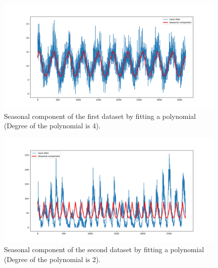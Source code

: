 \begin{figure}[H]
    \centering
    \begin{minipage}[b]{1\textwidth}
        \includegraphics[width=\textwidth]{figures/Ass1/Ass1_D1_fiting_polynomial.png}
    \end{minipage}
    \caption{Seasonal component of the first dataset by fitting a polynomial (Degree of the polynomial is 4).}
    \label{fig:Ass1_D1_fiting_polynomial}
\end{figure}

\begin{figure}[H]
    \centering
    \begin{minipage}[b]{1\textwidth}
        \includegraphics[width=\textwidth]{figures/Ass1/Ass1_D2_fiting_polynomial.png}
    \end{minipage}
    \caption{Seasonal component of the second dataset by fitting a polynomial (Degree of the polynomial is 2).}
    \label{fig:Ass1_D2_fiting_polynomial}
\end{figure}

